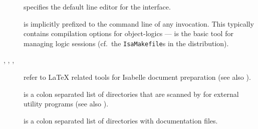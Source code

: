 \begin{isabellebody}
\begin{isamarkuptext}
\begin{description}
  \item[\hypertarget{setting.ISABELLE-LINE-EDITOR}{\hyperlink{setting.ISABELLE-LINE-EDITOR}{\mbox{}}}] specifies the default
  line editor for the \hyperlink{tool.tty}{\mbox{}} interface.

  \item[\hypertarget{setting.ISABELLE-USEDIR-OPTIONS}{\hyperlink{setting.ISABELLE-USEDIR-OPTIONS}{\mbox{}}}] is implicitly prefixed
  to the command line of any \hyperlink{tool.usedir}{\mbox{}} invocation. This
  typically contains compilation options for object-logics --- \hyperlink{tool.usedir}{\mbox{}} is the basic tool for managing logic sessions (cf.\ the
  \verb|IsaMakefile|s in the distribution).

  \item[\hypertarget{setting.ISABELLE-LATEX}{\hyperlink{setting.ISABELLE-LATEX}{\mbox{}}}, \hypertarget{setting.ISABELLE-PDFLATEX}{\hyperlink{setting.ISABELLE-PDFLATEX}{\mbox{}}}, \hypertarget{setting.ISABELLE-BIBTEX}{\hyperlink{setting.ISABELLE-BIBTEX}{\mbox{}}}, \hypertarget{setting.ISABELLE-DVIPS}{\hyperlink{setting.ISABELLE-DVIPS}{\mbox{}}}] refer to {\LaTeX} related tools for Isabelle
  document preparation (see also ).
  
  \item[\hypertarget{setting.ISABELLE-TOOLS}{\hyperlink{setting.ISABELLE-TOOLS}{\mbox{}}}] is a colon separated list of
  directories that are scanned by \hyperlink{executable.isabelle}{\mbox{}} for external
  utility programs (see also ).
  
  \item[\hypertarget{setting.ISABELLE-DOCS}{\hyperlink{setting.ISABELLE-DOCS}{\mbox{}}}] is a colon separated list of
  directories with documentation files.
  

\end{description}
\end{isamarkuptext}
\end{isabellebody}
